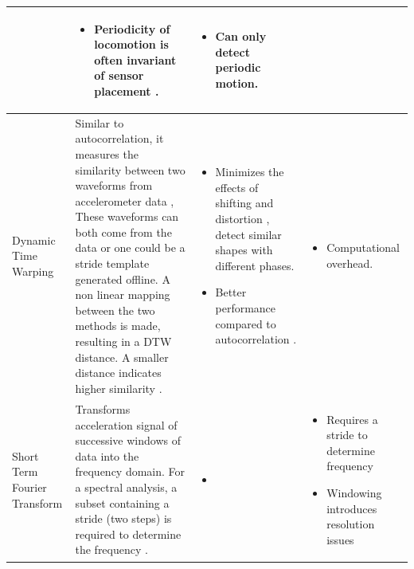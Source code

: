 \begin{landscape}
\begin{table}[h]
\begin{tabularx}{\linewidth}{@{} P{17mm} P{95mm} L L@{}}
		& 
		 \begin{itemize}[noitemsep,topsep=-10pt]
		 	\item Periodicity of locomotion is often invariant of sensor placement \cite{Harle2013}.
		 \end{itemize} \nointerlineskip & 
		 \begin{itemize}[noitemsep,topsep=-10pt]
		 	\item Can only detect periodic motion.
		 \end{itemize} \nointerlineskip 
 		 \\ \hline
  Dynamic Time Warping & Similar to autocorrelation, it measures the similarity between two waveforms from accelerometer data \cite{Davidson2017}, These waveforms can both come from the data or one could be a stride template generated offline. A non linear mapping between the two methods is made, resulting in a DTW distance. A smaller distance indicates higher similarity \cite{Davidson2017}. & 
 		 \begin{itemize}[noitemsep,topsep=-10pt]
 		 	\item Minimizes  the  effects  of  shifting and distortion \cite{Senin2008}, detect similar shapes with different phases.
 		 	\item Better performance compared to autocorrelation \cite{Davidson2017}.
 		 \end{itemize} \nointerlineskip  & 
 	 	\begin{itemize}[noitemsep,topsep=-10pt]
 		 \item Computational overhead. \cite{Davidson2017, Harle2013}
 	 	\end{itemize} \nointerlineskip  \\ \hline
  Short Term Fourier Transform & Transforms acceleration signal  of successive windows of data into the frequency domain. For a spectral analysis, a subset containing a stride (two steps) is required to determine the frequency \cite{Harle2013}. &
		\begin{itemize}[noitemsep,topsep=-10pt]
		  	\item 
		\end{itemize}\nointerlineskip &
		\begin{itemize}[noitemsep,topsep=-10pt]
			\item Requires a stride to determine frequency 
			\item  Windowing introduces resolution issues \cite{Harle2013} 
		\end{itemize} \nointerlineskip \\ \hline

\end{tabularx}
\end{table}
\end{landscape}
